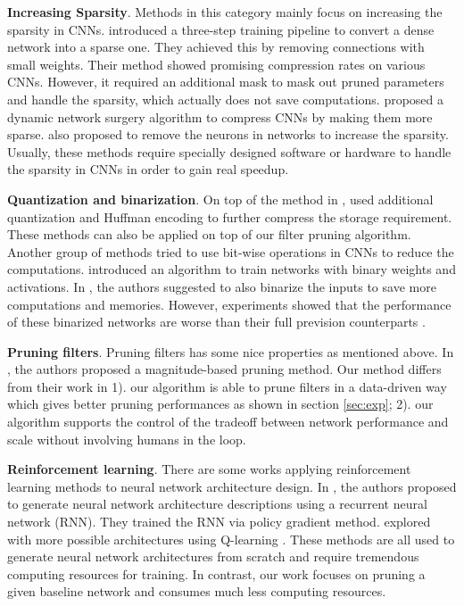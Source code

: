 \documentclass[10pt,twocolumn,letterpaper]{article}
\begin{document}
\textbf{Increasing Sparsity}. Methods in this category mainly focus on increasing the sparsity in CNNs. \cite{han_both,han_deep} introduced a three-step training pipeline to convert a dense network into a sparse one. They achieved this by removing connections with small weights. Their method showed promising compression rates on various CNNs. However, it required an additional mask to mask out pruned parameters and handle the sparsity, which actually does not save computations. \cite{dns} proposed a dynamic network surgery algorithm to compress CNNs by making them more sparse. \cite{alvarez2016learning,zhou2016less,BMVC2015_31} also proposed to remove the neurons in networks to increase the sparsity. Usually, these methods require specially designed software or hardware \cite{eie} to handle the sparsity in CNNs in order to gain real speedup.

\textbf{Quantization and binarization}. On top of the method in \cite{han_both}, \cite{han_deep} used additional quantization and Huffman encoding to further compress the storage requirement. These methods can also be applied on top of our filter pruning algorithm. Another group of methods tried to use bit-wise operations in CNNs to reduce the computations. \cite{bnn} introduced an algorithm to train networks with binary weights and activations. In \cite{xnor}, the authors suggested to also binarize the inputs to save more computations and memories. However, experiments showed that the performance of these binarized networks are worse than their full prevision counterparts \cite{xnor}.


\textbf{Pruning filters}. Pruning filters has some nice properties as mentioned above. In \cite{iclr17}, the authors proposed a magnitude-based pruning method. Our method differs from their work in 1). our algorithm is able to prune filters in a data-driven way which gives better pruning performances as shown in section \ref{sec:exp}; 2). our algorithm supports the control of the tradeoff between network performance and scale without involving humans in the loop.

\textbf{Reinforcement learning}. There are some works applying reinforcement learning methods to neural network architecture design. In \cite{ns}, the authors proposed to generate neural network architecture descriptions using a recurrent neural network (RNN). They trained the RNN via policy gradient method. \cite{nd} explored with more possible architectures using Q-learning \cite{Q1, Q2}. These methods are all used to generate neural network architectures from scratch and require tremendous computing resources for training. In contrast, our work focuses on pruning a given baseline network and consumes much less computing resources. 
\end{document}
